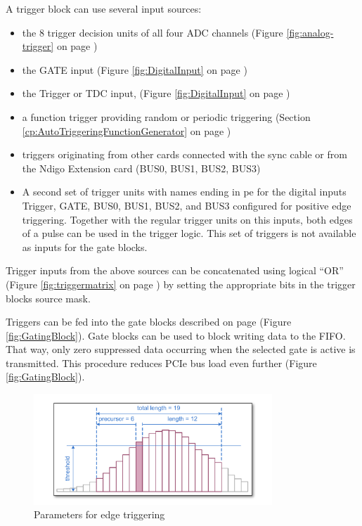 A trigger block can use several input sources:

\begin{itemize}
    \item the 8 trigger decision units of all four ADC channels (Figure \ref{fig:analog-trigger} on page \pageref{fig:analog-trigger})
    \item the GATE input (Figure \ref{fig:DigitalInput} on page \pageref{fig:DigitalInput})
    \item the Trigger or TDC input,  (Figure \ref{fig:DigitalInput} on page \pageref{fig:DigitalInput})
    \item a function trigger providing random or periodic triggering (Section \ref{cp:AutoTriggeringFunctionGenerator} on page \pageref{cp:AutoTriggeringFunctionGenerator})
    \item triggers originating from other cards connected with the sync cable or from the Ndigo Extension card (BUS0, BUS1, BUS2, BUS3)
    \item A second set of trigger units with names ending in \textsf{\tu pe} for the digital inputs Trigger, GATE, BUS0, BUS1, BUS2, and BUS3 configured for positive edge triggering. Together with the regular trigger units on this inputs, both edges of a pulse can be used in the trigger logic. This set of triggers is not available as inputs for the gate blocks.
\end{itemize}

Trigger inputs from the above sources can be concatenated using logical ``OR'' (Figure \ref{fig:triggermatrix} on page \pageref{fig:triggermatrix}) by setting the appropriate bits in the trigger blocks source mask.\par

Triggers can be fed into the gate blocks described on page \pageref{fig:GatingBlock} (Figure \ref{fig:GatingBlock}). Gate blocks can be used to block writing data to the FIFO. That way, only zero suppressed data occurring when the selected gate is active is transmitted. This procedure reduces PCIe bus load even further (Figure \ref{fig:GatingBlock}).

\begin{figure}[ht]
    \centering
    \includegraphics[width=0.8\textwidth]{figures/edge-trigger.pdf}
    \caption{Parameters for edge triggering\label{fig:edge-trigger}}
\end{figure}

